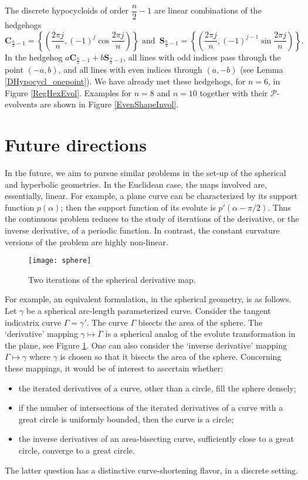 \documentclass[12pt]{article}
\newcommand{\Pev}{\mathcal{P}}
\begin{document}
The discrete hypocycloids of order $\dfrac{n}2 - 1$ are linear combinations of the hedgehogs
\begin{equation*}
\mathbf{C}_{\frac{n}2 - 1} = \left\{\left( \frac{2\pi j}n, (-1)^j\cos\frac{2\pi j}n \right) \right\} \mbox{ and }\,\mathbf{S}_{\frac{n}2 - 1} = \left\{\left( \frac{2\pi j}n, (-1)^{j-1}\sin\frac{2\pi j}n \right)\right\}.
\end{equation*}
In the hedgehog $a\mathbf{C}_{\frac{n}2 - 1} + b\mathbf{S}_{\frac{n}2 - 1}$, all lines with odd indices pass through the point $(-a,b)$, and all lines with even indices through $(a,-b)$ (see Lemma \ref{DHypocycl_onepoint}). We have already met these hedgehogs, for $n=6$, in Figure \ref{RegHexEvol}. Examples for $n=8$ and $n=10$ together with their $\Pev$-evolvents are shown in Figure \ref{EvenShapeInvol}.

\section{Future directions}\label{future_directions}

In the future, we aim to pursue similar problems in the set-up of the spherical and hyperbolic geometries. In the Euclidean case, the maps involved are, essentially, linear. For example,  a plane curve can be characterized by its support function $p(\alpha)$; then the support function of its evolute is $p'(\alpha-\pi/2)$. Thus the continuous problem reduces to the study of iterations of the derivative, or the inverse derivative, of a periodic function. In contrast, the constant curvature versions of the problem are highly non-linear.

\begin{figure}[hbtp]
\centering
\texttt{[image: sphere]}
\caption{Two iterations of the spherical derivative map.}
\label{sphere}
\end{figure}

For example, an equivalent formulation, in the spherical geometry, is as follows. Let $\gamma$ be a spherical arc-length parameterized curve. Consider the tangent indicatrix curve $\Gamma = \gamma'$. The curve $\Gamma$ bisects the area of the sphere. 
The `derivative' mapping $\gamma \mapsto \Gamma$ is a spherical analog of the evolute transformation in the plane, see Figure \ref{sphere}. 
One can also consider the `inverse derivative'  mapping $\Gamma \mapsto \gamma$ where $\gamma$ is chosen so that it bisects the area of the sphere. 
Concerning these mappings, it would be of interest to ascertain whether:
\begin{itemize}
\item the iterated derivatives of a curve, other than a circle, fill the sphere densely;
\item if the number of intersections of the iterated derivatives of a curve with a great circle is uniformly bounded, then the curve is a circle;
\item the inverse derivatives of an area-bisecting curve, sufficiently close to a great circle, converge to a great circle.
\end{itemize}
The latter question has a distinctive curve-shortening flavor, in a discrete setting.
\end{document}
